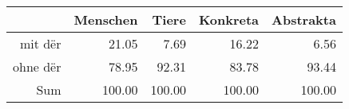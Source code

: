 \begin{tabular}{rrrrr}
  \hline
 & Menschen & Tiere & Konkreta & Abstrakta \\ 
  \hline
mit dër & 21.05 & 7.69 & 16.22 & 6.56 \\ 
  ohne dër & 78.95 & 92.31 & 83.78 & 93.44 \\ 
  Sum & 100.00 & 100.00 & 100.00 & 100.00 \\ 
   \hline
\end{tabular}
